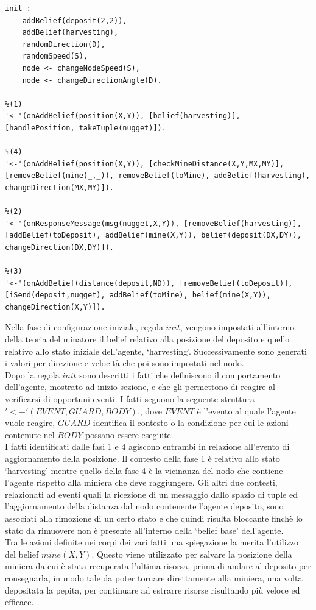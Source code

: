 \medskip
\begin{lstlisting}[firstnumber=1,label={lst:Goldmine},caption={Teoria miniera}]
init :-
    addBelief(deposit(2,2)),
    addBelief(harvesting),
    randomDirection(D),
    randomSpeed(S),
    node <- changeNodeSpeed(S),
    node <- changeDirectionAngle(D).

%(1)
'<-'(onAddBelief(position(X,Y)), [belief(harvesting)], [handlePosition, takeTuple(nugget)]).

%(4)
'<-'(onAddBelief(position(X,Y)), [checkMineDistance(X,Y,MX,MY)], [removeBelief(mine(_,_)), removeBelief(toMine), addBelief(harvesting), changeDirection(MX,MY)]).

%(2)
'<-'(onResponseMessage(msg(nugget,X,Y)), [removeBelief(harvesting)], [addBelief(toDeposit), addBelief(mine(X,Y)), belief(deposit(DX,DY)), changeDirection(DX,DY)]).

%(3)
'<-'(onAddBelief(distance(deposit,ND)), [removeBelief(toDeposit)], [iSend(deposit,nugget), addBelief(toMine), belief(mine(X,Y)), changeDirection(X,Y)]).
\end{lstlisting}
Nella fase di configurazione iniziale, regola $init$, vengono impostati all'interno della teoria del minatore il belief relativo alla posizione del deposito e quello relativo allo stato iniziale dell'agente, `harvesting'. Successivamente sono generati i valori per direzione e velocità che poi sono impostati nel nodo.
\\
Dopo la regola $init$ sono descritti i fatti che definiscono il comportamento dell'agente, mostrato ad inizio sezione, e che gli permettono di reagire al verificarsi di opportuni eventi.
I fatti seguono la seguente struttura $'<-'(EVENT, GUARD, BODY).$, dove $EVENT$ è l'evento al quale l'agente vuole reagire, $GUARD$ identifica il contesto o la condizione per cui le azioni contenute nel $BODY$ possano essere eseguite.
\\
I fatti identificati dalle fasi 1 e 4 agiscono entrambi in relazione all'evento di aggiornamento della posizione. Il contesto della fase 1 è relativo allo stato `harvesting' mentre quello della fase 4 è la vicinanza del nodo che contiene l'agente rispetto alla miniera che deve raggiungere.
Gli altri due contesti, relazionati ad eventi quali la ricezione di un messaggio dallo spazio di tuple ed l'aggiornamento della distanza dal nodo contenente l'agente deposito, sono associati alla rimozione di un certo stato e che quindi risulta bloccante finchè lo stato da rimuovere non è presente all'interno della `belief base' dell'agente.
\\
Tra le azioni definite nei corpi dei vari fatti una spiegazione la merita l'utilizzo del belief $mine(X,Y)$. Questo viene utilizzato per salvare la posizione della miniera da cui è stata recuperata l'ultima risorsa, prima di andare al deposito per consegnarla, in modo tale da poter tornare direttamente alla miniera, una volta depositata la pepita, per continuare ad estrarre risorse risultando più veloce ed efficace.

